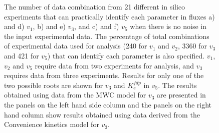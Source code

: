 \documentclass[10pt]{article}
\begin{document}
\begin{figure}[!tbhp]
	\caption{The number of data combination from 21 different in silico experiments that can practically identify each parameter in fluxes a) and d) $v_1$, b) and e) $v_3$, and c) and f) $v_5$ when there is no noise in the input experimental data. The percentage of total combinations of experimental data used for analysis (240 for $v_1$ and $v_2$, 3360 for $v_3$ and 421 for $v_5$) that can identify each parameter is also specified. $v_1$, $v_2$ and $v_5$ require data from two experiments for analysis, and $v_3$ requires data from three experiments. Results for only one of the two possible roots are shown for $v_3$ and $K_e^{fdp}$ in $v_5$. The results obtained using data from the MWC model for $v_3$ are presented in the panels on the left hand side column and the panels on the right hand column show results obtained using data derived from the Convenience kinetics model for $v_3$.}\label{fig:ident_root2}
\end{figure}
\end{document}
